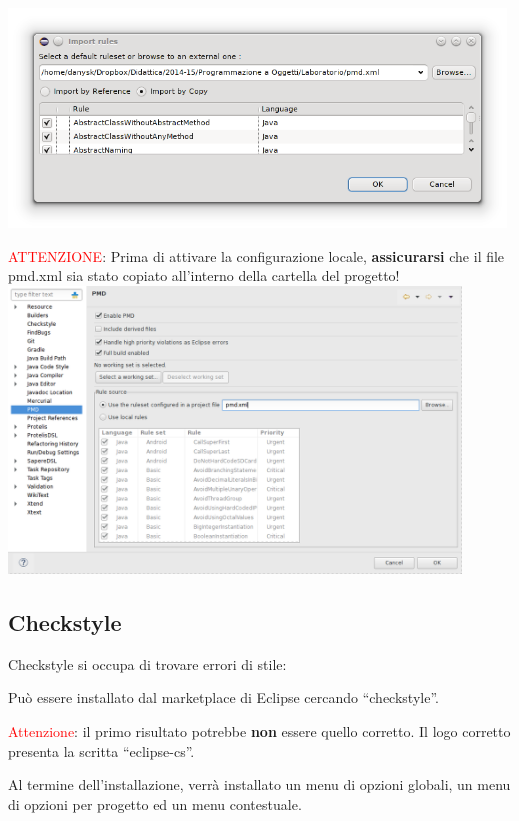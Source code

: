 \documentclass[presentation]{beamer}
\begin{document}
 {
	\centering
	\includegraphics[width=0.99\textwidth]{img/pmdimport}
}

 {
	\textcolor{red}{ATTENZIONE}: Prima di attivare la configurazione locale, \textbf{assicurarsi} che il file pmd.xml sia stato copiato all'interno della cartella del progetto!
	\centering
	\includegraphics[width=0.9\textwidth]{img/pmdproj}
}


\subsection{Checkstyle}

 {
	 {
		Checkstyle si occupa di trovare errori di stile:
	}
}

 {
	 {
		Può essere installato dal marketplace di Eclipse cercando ``checkstyle''.
		
		\textcolor{red}{Attenzione}: il primo risultato potrebbe \textbf{non} essere quello corretto. Il logo corretto presenta la scritta ``eclipse-cs''.

		Al termine dell'installazione, verrà installato un menu di opzioni globali, un menu di opzioni per progetto ed un menu contestuale.
	}
}
\end{document}
